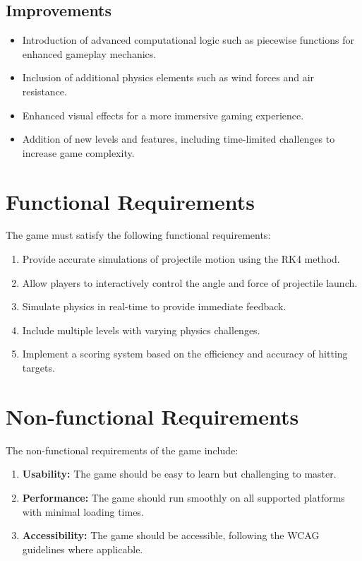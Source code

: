 \documentclass[12pt]{article}
\begin{document}
\subsection{Improvements}
\begin{itemize}
    \item Introduction of advanced computational logic such as piecewise functions for enhanced gameplay mechanics.
    \item Inclusion of additional physics elements such as wind forces and air resistance.
    \item Enhanced visual effects for a more immersive gaming experience.
    \item Addition of new levels and features, including time-limited challenges to increase game complexity.
\end{itemize}

\section{Functional Requirements}
The game must satisfy the following functional requirements:
\begin{enumerate}
    \item Provide accurate simulations of projectile motion using the RK4 method.
    \item Allow players to interactively control the angle and force of projectile launch.
    \item Simulate physics in real-time to provide immediate feedback.
    \item Include multiple levels with varying physics challenges.
    \item Implement a scoring system based on the efficiency and accuracy of hitting targets.
\end{enumerate}

\section{Non-functional Requirements}
The non-functional requirements of the game include:
\begin{enumerate}
    \item \textbf{Usability:} The game should be easy to learn but challenging to master.
    \item \textbf{Performance:} The game should run smoothly on all supported platforms with minimal loading times.
    \item \textbf{Accessibility:} The game should be accessible, following the WCAG guidelines where applicable.
\end{enumerate}
\end{document}
